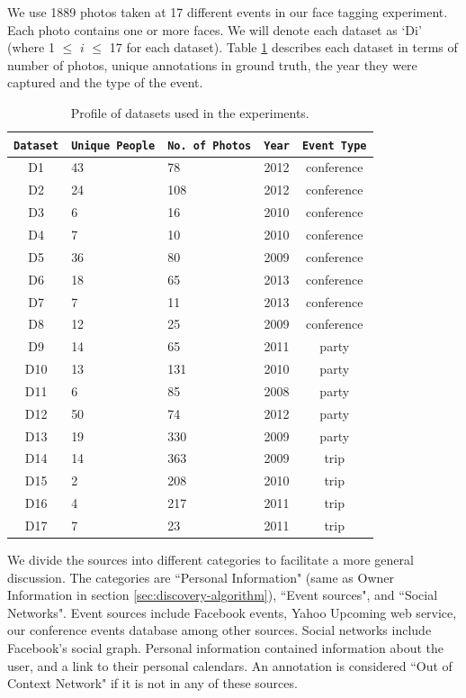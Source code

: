 We use 1889 photos taken at 17 different events in our face tagging experiment. Each photo contains one or more faces. We will denote each dataset as `Di' (where 1 $\leq$ $i$ $\leq$ 17 for each dataset). Table \ref{tbl:unique-persons} describes each dataset in terms of number of photos, unique annotations in ground truth, the year they were captured and the type of the event. 

\begin{table}[h]
\begin{center}
\begin{tabular}{ |c|p{1.5cm}|p{1.5cm}|c|c| }
  \hline
  \texttt{Dataset} & \texttt{Unique People} & \texttt{No.\ of Photos} & \texttt{Year} & \texttt{Event Type}\\
  \hline
     D1  &  43   &   78   &  2012  &  conference \\
     D2  &  24   &   108  &  2012  &  conference \\
     D3  &  6    &   16   &  2010  &  conference \\
     D4  &  7    &   10   &  2010  &  conference \\
     D5  &  36   &   80   &  2009  &  conference \\
     D6  &  18   &   65   &  2013  &  conference \\
     D7  &  7    &   11   &  2013  &  conference \\
     D8  &  12   &   25   &  2009  &  conference \\
     D9  &  14   &   65   &  2011  &  party \\
    D10  &  13   &   131  &  2010  &  party \\
    D11  &  6    &   85   &  2008  &  party \\
    D12  &  50   &   74   &  2012  &  party \\
    D13  &  19   &   330  &  2009  &  party \\
    D14  &  14   &   363  &  2009  &  trip \\
    D15  &  2    &   208  &  2010  &  trip \\
    D16  &  4    &   217  &  2011  &  trip \\
    D17  &  7    &   23   &  2011  &  trip \\
  \hline
\end{tabular}
\caption{Profile of datasets used in the experiments.}
\label{tbl:unique-persons}
\end{center}
\end{table}

We divide the sources into different categories to facilitate a more general discussion. The categories are ``Personal Information" (same as Owner Information in section \ref{sec:discovery-algorithm}), ``Event sources", and ``Social Networks". Event sources include Facebook events, Yahoo Upcoming web service, our conference events database among other sources. Social networks include Facebook's social graph. Personal information contained information about the user, and a link to their personal calendars. An annotation is considered ``Out of Context Network" if it is not in any of these sources.

